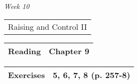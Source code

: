 \documentclass[12pt]{article}
\begin{document}
\textit{Week 10} \dotfill \begin{tabular}[t]{l} Raising and Control II \end{tabular}
\begin{flushright}
\begin{tabular}[t]{|l|p{2in}|}\hline \textbf{Reading} & Chapter 9\\\hline \end{tabular}


\begin{tabular}[t]{|l|p{4in}|}\hline \textbf{Exercises} & 5, 6, 7, 8 (p. 257-8) \\ \hline
\end{tabular}
\end{flushright}
\end{document}
